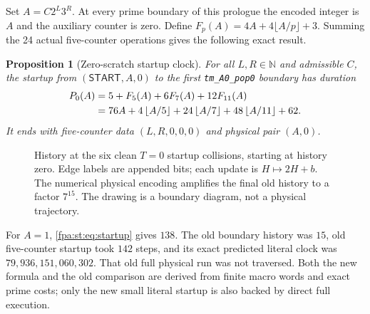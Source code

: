 \documentclass[11pt,a4paper]{article}
\numberwithin{equation}{section}
\newtheorem{proposition}[theorem]{Proposition}
\newcommand{\N}{\mathbb N}\newcommand{\Z}{\mathbb Z}\newcommand{\R}{\mathbb R}
\newcommand{\START}{\mathsf{START}}
\newcommand{\code}[1]{\texttt{\small #1}}
\newcommand{\floor}[1]{\left\lfloor #1\right\rfloor}
\begin{document}
Set $A=C2^L3^R$. At every prime boundary of this prologue the encoded integer
is $A$ and the auxiliary counter is zero. Define
$F_p(A)=4A+4\lfloor A/p\rfloor+3$. Summing the 24 actual five-counter
operations gives the following exact result.
\begin{proposition}[Zero-scratch startup clock]
\label{fpa:st:prop:startup}
For all $L,R\in\N$ and admissible $C$, the startup from
$(\START,A,0)$ to the first \code{tm\_A0\_pop0} boundary has duration
\begin{align}
 P_0(A)&=5+F_5(A)+6F_7(A)+12F_{11}(A)\notag\\
 &=76A+4\floor{A/5}+24\floor{A/7}+48\floor{A/11}+62.
 \label{fpa:st:eq:startup}
\end{align}
It ends with five-counter data $(L,R,0,0,0)$ and physical pair $(A,0)$.
\end{proposition}

\begin{figure}[htbp]
\centering
{}
\caption{History at the six clean $T=0$ startup collisions, starting at
history zero. Edge labels are appended bits; each update is $H\mapsto2H+b$.
The numerical physical encoding amplifies the final old history to a factor
$7^{15}$. The drawing is a boundary diagram, not a physical trajectory.}
\label{fpa:st:fig:history}
\end{figure}

For $A=1$, \eqref{fpa:st:eq:startup} gives $138$. The old boundary history was
$15$, old five-counter startup took $142$ steps, and its exact predicted
literal clock was $79{,}936{,}151{,}060{,}302$. That old full physical run
was not traversed. Both the new formula and the old comparison are derived
from finite macro words and exact prime costs; only the new small literal
startup is also backed by direct full execution.
\end{document}
